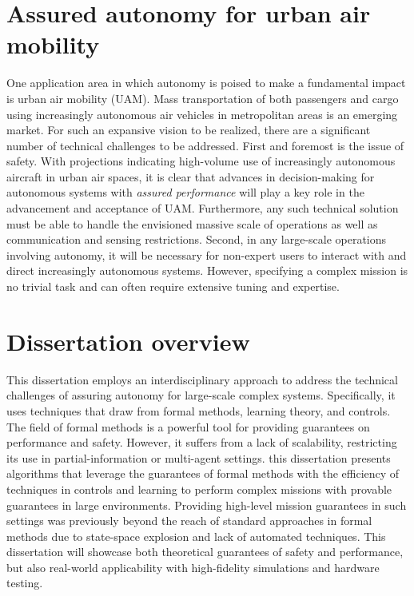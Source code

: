 \section{Assured autonomy for urban air mobility} One application area in which autonomy is poised to make a fundamental impact is urban air mobility (UAM). Mass transportation of both passengers and cargo using increasingly autonomous air vehicles in metropolitan areas is an emerging market. For such an expansive vision to be realized, there are a significant number of technical challenges to be addressed.  First and foremost is the issue of safety. With projections indicating high-volume use of increasingly autonomous aircraft in urban air spaces, it is clear that advances in decision-making for autonomous systems with \emph{assured performance} will play a key role in the advancement and acceptance of UAM. Furthermore, any such technical solution must be able to handle the envisioned massive scale of operations as well as communication and sensing restrictions. Second, in any large-scale operations involving autonomy, it will be necessary for non-expert users to interact with and direct increasingly autonomous systems. However, specifying a complex mission is no trivial task and can often require extensive tuning and expertise. 

\section{Dissertation overview}

This dissertation employs an interdisciplinary approach to address the technical challenges of assuring autonomy for large-scale complex systems. Specifically, it uses techniques that draw from formal methods, learning theory, and controls. The field of formal methods is a powerful tool for providing guarantees on performance and safety. However, it suffers from a lack of scalability, restricting its use in partial-information or multi-agent settings. this dissertation presents algorithms that leverage the guarantees of formal methods with the efficiency of techniques in controls and learning to perform complex missions with provable guarantees in large environments. Providing high-level mission guarantees in such settings was previously beyond the reach of standard approaches in formal methods due to state-space explosion and lack of automated techniques. This dissertation will showcase both theoretical guarantees of safety and performance, but also real-world applicability with high-fidelity simulations and hardware testing. 

